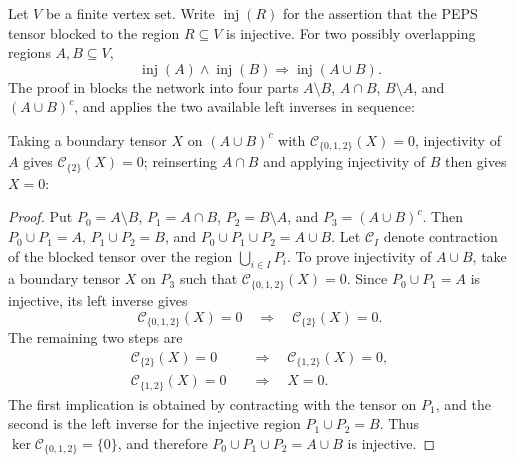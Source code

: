 \begin{lemma}%
    \label{lem:peps_injectiveRegion_union}
    \notready
    Let $V$ be a finite vertex set. Write $\operatorname{inj}(R)$ for the
    assertion that the PEPS tensor blocked to the region $R\subseteq V$ is
    injective. For two possibly overlapping regions $A,B\subseteq V$,
    \[
        \operatorname{inj}(A)\wedge\operatorname{inj}(B)
        \Longrightarrow
        \operatorname{inj}(A\cup B).
    \]
    The proof in \cite[Section~3]{Molnar2018NormalPEPS} blocks the network into
    four parts $A\setminus B$, $A\cap B$, $B\setminus A$, and
    $(A\cup B)^c$, and applies the two available left inverses in sequence:
    \begin{center}
        \TNPEPSInjectiveRegionUnion
    \end{center}
    Taking a boundary tensor $X$ on $(A\cup B)^c$ with
    $\mathcal C_{\{0,1,2\}}(X)=0$, injectivity of $A$ gives
    $\mathcal C_{\{2\}}(X)=0$; reinserting $A\cap B$ and applying
    injectivity of $B$ then gives $X=0$:
    \begin{center}
        \TNPEPSInjectiveRegionUnionProof
    \end{center}
\end{lemma}
\begin{proof}
    Put $P_0=A\setminus B$, $P_1=A\cap B$, $P_2=B\setminus A$, and
    $P_3=(A\cup B)^c$. Then $P_0\cup P_1=A$, $P_1\cup P_2=B$, and
    $P_0\cup P_1\cup P_2=A\cup B$. Let $\mathcal C_I$ denote contraction of
    the blocked tensor over the region $\bigcup_{i\in I}P_i$. To prove
    injectivity of $A\cup B$, take a boundary tensor $X$ on $P_3$ such that
    $\mathcal C_{\{0,1,2\}}(X)=0$. Since $P_0\cup P_1=A$ is injective, its
    left inverse gives
    \[
        \mathcal C_{\{0,1,2\}}(X)=0
        \quad\Longrightarrow\quad
        \mathcal C_{\{2\}}(X)=0.
    \]
    The remaining two steps are
    \[
        \begin{aligned}
            \mathcal C_{\{2\}}(X)=0
             & \quad\Longrightarrow\quad
            \mathcal C_{\{1,2\}}(X)=0,   \\
            \mathcal C_{\{1,2\}}(X)=0
             & \quad\Longrightarrow\quad
            X=0.
        \end{aligned}
    \]
    The first implication is obtained by contracting with the tensor on
    $P_1$, and the second is the left inverse for the injective region
    $P_1\cup P_2=B$.
    Thus $\ker \mathcal C_{\{0,1,2\}}=\{0\}$, and therefore
    $P_0\cup P_1\cup P_2=A\cup B$ is injective.
\end{proof}

